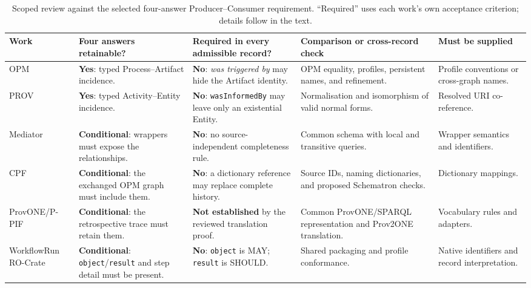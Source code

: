 \documentclass[conference]{IEEEtran}
\theoremstyle{tideproposition}
\begin{document}
\begin{table}[!t]
\caption{Scoped review against the selected four-answer Producer--Consumer requirement. ``Required'' uses each work's own acceptance criterion; details follow in the text.}
\label{tab:prior}
\centering
\footnotesize
\renewcommand{\arraystretch}{1.12}
\setlength{\tabcolsep}{2.5pt}
\begin{tabularx}{\textwidth}{@{}
>{\raggedright\arraybackslash}p{}
>{\raggedright\arraybackslash}p{}
>{\raggedright\arraybackslash}p{}
>{\raggedright\arraybackslash}p{}
Y@{}}
\toprule
Work & Four answers retainable? & Required in every admissible record? & Comparison or cross-record check & Must be supplied\\
\midrule
OPM\newline\cite{opm} & \textbf{Yes}: typed Process--Artifact incidence. & \textbf{No}: \emph{was triggered by} may hide the Artifact identity. & OPM equality, profiles, persistent names, and refinement. & Profile conventions or cross-graph names.\\
PROV\newline\cite{prov-dm,prov-constraints} & \textbf{Yes}: typed Activity--Entity incidence. & \textbf{No}: \texttt{wasInformedBy} may leave only an existential Entity. & Normalisation and isomorphism of valid normal forms. & Resolved URI co-reference.\\
Mediator\newline\cite{mediator} & \textbf{Conditional}: wrappers must expose the relationships. & \textbf{No}: no source-independent completeness rule. & Common schema with local and transitive queries. & Wrapper semantics and identifiers.\\
CPF\newline\cite{cpf} & \textbf{Conditional}: the exchanged OPM graph must include them. & \textbf{No}: a dictionary reference may replace complete history. & Source IDs, naming dictionaries, and proposed Schematron checks. & Dictionary mappings.\\
ProvONE/\newline P-PIF\newline\cite{ppif} & \textbf{Conditional}: the retrospective trace must retain them. & \textbf{Not established} by the reviewed translation proof. & Common ProvONE/SPARQL representation and Prov2ONE translation. & Vocabulary rules and adapters.\\
Workflow\newline Run RO-Crate\newline\cite{wfrun,wfrun-profile} & \textbf{Conditional}: \texttt{object}/\texttt{result} and step detail must be present. & \textbf{No}: \texttt{object} is MAY; \texttt{result} is SHOULD. & Shared packaging and profile conformance. & Native identifiers and record interpretation.\\

\end{tabularx}
\end{table}
\end{document}
